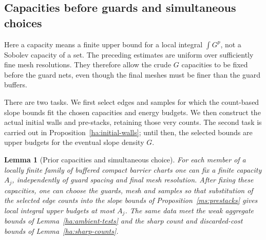 \documentclass[11pt]{article}
\numberwithin{equation}{section}
\newtheorem{lemma}[theorem]{Lemma}
\theoremstyle{definition}
\theoremstyle{remark}
\begin{document}
\subsection{Capacities before guards and simultaneous choices}
\label{ha:guard-schedule}

Here a capacity means a finite upper bound for a local integral
$\int G^p$, not a Sobolev capacity of a set.  The preceding estimates
are uniform over sufficiently fine mesh
resolutions.  They therefore allow the crude $G$ capacities to be
fixed before the guard nets, even though the final meshes must be
finer than the guard buffers.

There are two tasks.  We first select edges and samples for which
the count-based slope bounds fit the chosen capacities and energy
budgets.  We then construct the actual initial walls and pre-stacks,
retaining those very counts.  The second task is carried out in
Proposition~\ref{ha:initial-walls}; until then, the selected bounds
are upper budgets for the eventual slope density $G$.

\begin{lemma}[Prior capacities and simultaneous choice]\label{ha:capacities}
For each member of a locally finite family of buffered compact
barrier charts one can fix a finite capacity $A_j$, independently of
guard spacing and final mesh resolution.  After fixing these
capacities, one can choose the guards, mesh and samples so that
substitution of the selected edge counts into the slope bounds of
Proposition~\ref{ms:prestacks} gives local integral upper budgets
at most $A_j$.  The same data meet the weak aggregate bounds of
Lemma~\ref{ha:ambient-tests} and the sharp count and discarded-cost
bounds of Lemma~\ref{ha:sharp-counts}.
\end{lemma}
\end{document}
